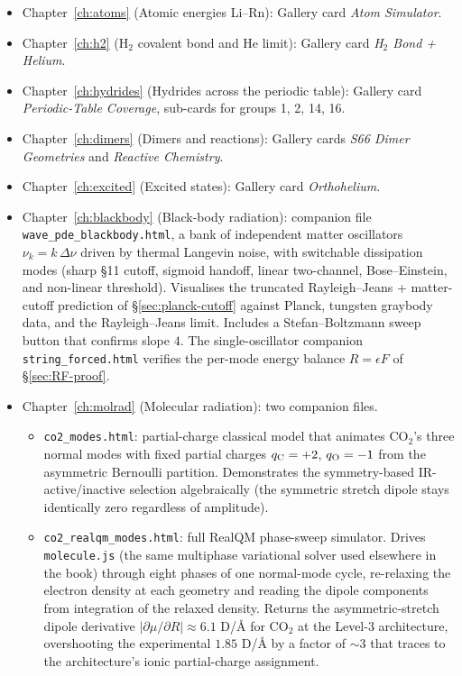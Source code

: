 \begin{itemize}
\item Chapter~\ref{ch:atoms} (Atomic energies Li--Rn): Gallery card \emph{Atom Simulator}.
\item Chapter~\ref{ch:h2} (H$_2$ covalent bond and He limit): Gallery card \emph{H$_2$ Bond + Helium}.
\item Chapter~\ref{ch:hydrides} (Hydrides across the periodic table): Gallery card \emph{Periodic-Table Coverage}, sub-cards for groups 1, 2, 14, 16.
\item Chapter~\ref{ch:dimers} (Dimers and reactions): Gallery cards \emph{S66 Dimer Geometries} and \emph{Reactive Chemistry}.
\item Chapter~\ref{ch:excited} (Excited states): Gallery card \emph{Orthohelium}.
\item Chapter~\ref{ch:blackbody} (Black-body radiation): companion file \texttt{wave\_pde\_blackbody.html}, a bank of independent matter oscillators $\nu_k = k\,\Delta\nu$ driven by thermal Langevin noise, with switchable dissipation modes (sharp §11 cutoff, sigmoid handoff, linear two-channel, Bose--Einstein, and non-linear threshold). Visualises the truncated Rayleigh--Jeans + matter-cutoff prediction of \S\ref{sec:planck-cutoff} against Planck, tungsten graybody data, and the Rayleigh--Jeans limit. Includes a Stefan--Boltzmann sweep button that confirms slope $4$. The single-oscillator companion \texttt{string\_forced.html} verifies the per-mode energy balance $R = \epsilon F$ of \S\ref{sec:RF-proof}.
\item Chapter~\ref{ch:molrad} (Molecular radiation): two companion files.
\begin{itemize}
\item \texttt{co2\_modes.html}: partial-charge classical model that animates CO$_2$'s three normal modes with fixed partial charges $q_{\rm C} = +2$, $q_{\rm O} = -1$ from the asymmetric Bernoulli partition. Demonstrates the symmetry-based IR-active/inactive selection algebraically (the symmetric stretch dipole stays identically zero regardless of amplitude).
\item \texttt{co2\_realqm\_modes.html}: full RealQM phase-sweep simulator. Drives \texttt{molecule.js} (the same multiphase variational solver used elsewhere in the book) through eight phases of one normal-mode cycle, re-relaxing the electron density at each geometry and reading the dipole components from integration of the relaxed density. Returns the asymmetric-stretch dipole derivative $|\partial\mu/\partial R| \approx 6.1$ D/\AA{} for CO$_2$ at the Level-3 architecture, overshooting the experimental $1.85$ D/\AA{} by a factor of $\sim 3$ that traces to the architecture's ionic partial-charge assignment.

\end{itemize}
\end{itemize}
